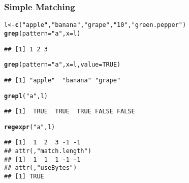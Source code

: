 \documentclass[paper=screen,mathserif]{beamer}\usepackage[]{graphicx}\usepackage[]{color}
\makeatletter
\newcommand{\hlnum}[1]{\textcolor[rgb]{0.686,0.059,0.569}{#1}}%
\newcommand{\hlstr}[1]{\textcolor[rgb]{0.192,0.494,0.8}{#1}}%
\newcommand{\hlstd}[1]{\textcolor[rgb]{0.345,0.345,0.345}{#1}}%
\newcommand{\hlkwb}[1]{\textcolor[rgb]{0.69,0.353,0.396}{#1}}%
\newcommand{\hlkwc}[1]{\textcolor[rgb]{0.333,0.667,0.333}{#1}}%
\newcommand{\hlkwd}[1]{\textcolor[rgb]{0.737,0.353,0.396}{\textbf{#1}}}%
\newenvironment{kframe}{%
 \def\at@end@of@kframe{}%
 \ifinner\ifhmode%
  \def\at@end@of@kframe{\end{minipage}}%
  \begin{minipage}{\columnwidth}%
 \fi\fi%
 \def\FrameCommand##1{\hskip\@totalleftmargin \hskip-\fboxsep
 \colorbox{shadecolor}{##1}\hskip-\fboxsep
     \hskip-\linewidth \hskip-\@totalleftmargin \hskip\columnwidth}%
 \MakeFramed {\advance\hsize-\width
   \@totalleftmargin\z@ \linewidth\hsize
   \@setminipage}}%
 {\par\unskip\endMakeFramed%
 \at@end@of@kframe}
\newenvironment{knitrout}{}{} %
\newcommand{\ft}[1]{\frametitle{#1}}
\newenvironment{xframe}[1][]
{\begin{frame}[fragile,environment=xframe]
    \frametitle{#1}}
  {\end{frame}}
\makeatother
\begin{document}
\begin{xframe}
  \ft{Simple Matching}
  
\begin{knitrout}\scriptsize
{}\color{fgcolor}\begin{kframe}
\begin{alltt}
\hlstd{l} \hlkwb{<-} \hlkwd{c}\hlstd{(}\hlstr{"apple"}\hlstd{,} \hlstr{"banana"}\hlstd{,} \hlstr{"grape"}\hlstd{,} \hlstr{"10"}\hlstd{,} \hlstr{"green.pepper"}\hlstd{)}
\hlkwd{grep}\hlstd{(}\hlkwc{pattern} \hlstd{=} \hlstr{"a"}\hlstd{,} \hlkwc{x} \hlstd{= l)}
\end{alltt}
\begin{verbatim}
## [1] 1 2 3
\end{verbatim}
\begin{alltt}
\hlkwd{grep}\hlstd{(}\hlkwc{pattern} \hlstd{=} \hlstr{"a"}\hlstd{,} \hlkwc{x} \hlstd{= l,} \hlkwc{value} \hlstd{=} \hlnum{TRUE}\hlstd{)}
\end{alltt}
\begin{verbatim}
## [1] "apple"  "banana" "grape"
\end{verbatim}
\begin{alltt}
\hlkwd{grepl}\hlstd{(}\hlstr{"a"}\hlstd{, l)}
\end{alltt}
\begin{verbatim}
## [1]  TRUE  TRUE  TRUE FALSE FALSE
\end{verbatim}
\begin{alltt}
\hlkwd{regexpr}\hlstd{(}\hlstr{"a"}\hlstd{, l)}
\end{alltt}
\begin{verbatim}
## [1]  1  2  3 -1 -1
## attr(,"match.length")
## [1]  1  1  1 -1 -1
## attr(,"useBytes")
## [1] TRUE
\end{verbatim}
\end{kframe}
\end{knitrout}

\end{xframe}
\end{document}
